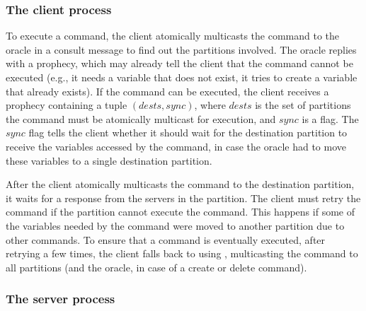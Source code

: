 






\subsubsection{The client process} 

To execute a command, the client atomically multicasts the command to the oracle in a consult message to find out the partitions involved.
The oracle replies with a prophecy, which may already tell the client that the command cannot be executed (e.g., it needs a variable that does not exist, it tries to create a variable that already exists).
If the command can be executed, the client receives a prophecy containing a tuple $(dests, sync)$, where $dests$ is the set of partitions the command must be atomically multicast for execution, and $sync$ is a flag.
The $sync$ flag tells the client whether it should wait for the destination partition to receive the variables accessed by the command, in case the oracle had to move these variables to a single destination partition.

After the client atomically multicasts the command to the destination partition, it waits for a response from the servers in the partition.
The client must retry the command if the partition cannot execute the command.
This happens if some of the variables needed by the command were moved to another partition due to other commands. 
To ensure that a command is eventually executed, after retrying a few times, the client falls back to using \ssmr{}, multicasting the command to all partitions (and the oracle, in case of a create or delete command).

\subsubsection{The server process} 

